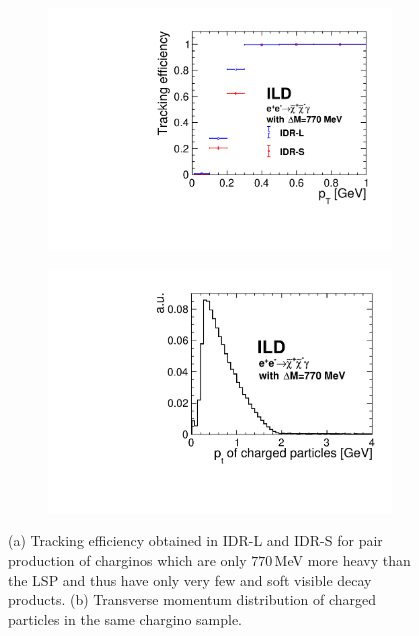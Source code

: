 \begin{figure}[htbp]
\begin{center}
\begin{subfigure}{0.49\hsize} 
 \includegraphics[width=\textwidth]{Performance/fig/efficiency_higgsinos.pdf}
 \caption{ \label{fig:higgsino:trkeffi:effi}}
 \end{subfigure}
\begin{subfigure}{0.49\hsize} 
\includegraphics[width=\textwidth]{Performance/fig/pt_tracks_higgsinos.pdf}
 \caption{  \label{fig:higgsino:trkeffi:pt}}
 \end{subfigure}
\end{center}
\caption{(a) Tracking efficiency obtained in IDR-L and IDR-S for pair production of charginos which are only $770$\,MeV more heavy than the LSP and thus have only very few and soft visible decay products. (b) Transverse momentum distribution of charged particles in the same chargino sample.
}
\label{fig:higgsino:trkeffi}
\end{figure}


